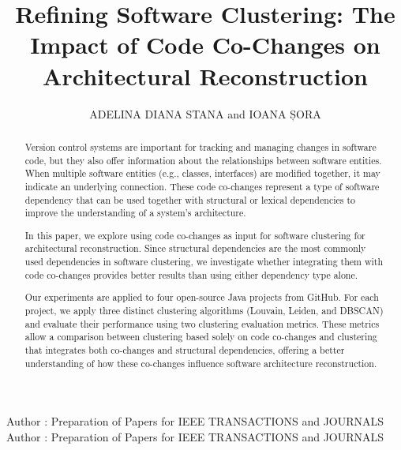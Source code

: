 \documentclass{ieeeaccess}
\begin{document}

\title{Refining Software Clustering: The Impact of Code Co-Changes on Architectural Reconstruction}
\author{\uppercase{Adelina Diana Stana} and
\uppercase{Ioana Șora}
}

\address[1]{Computer Science and Engineering Department
”Politehnica” University of Timisoara, Romania (e-mail: stana.adelina.diana@gmail.com)}
\address[2]{Computer Science and Engineering Department
”Politehnica” University of Timisoara, Romania (e-mail: ioana.sora@cs.upt.ro)}

\markboth
{Author \headeretal: Preparation of Papers for IEEE TRANSACTIONS and JOURNALS}
{Author \headeretal: Preparation of Papers for IEEE TRANSACTIONS and JOURNALS}


\begin{abstract}
Version control systems are important for tracking and managing changes in software code, but they also offer information about the relationships between software entities. When multiple software entities (e.g., classes, interfaces) are modified together, it may indicate an underlying connection. These code co-changes represent a type of software dependency that can be used together with structural or lexical dependencies to improve the understanding of a system's architecture.

In this paper, we explore using code co-changes as input for software clustering for architectural reconstruction. Since structural dependencies are the most commonly used dependencies in software clustering, we investigate whether integrating them with code co-changes provides better results than using either dependency type alone.

Our experiments are applied to four open-source Java projects from GitHub. For each project, we apply three distinct clustering algorithms (Louvain, Leiden, and DBSCAN) and evaluate their performance using two clustering evaluation metrics. These metrics allow a comparison between clustering based solely on code co-changes and clustering that integrates both co-changes and structural dependencies, offering a better understanding of how these co-changes influence software architecture reconstruction.
\end{abstract}
\end{document}
